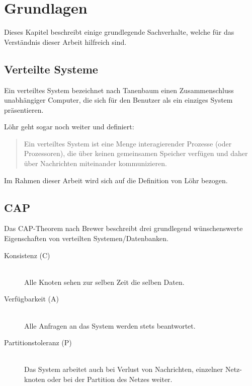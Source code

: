 \chapter{Grundlagen}
\label{chap:base}
Dieses Kapitel beschreibt einige grundlegende Sachverhalte,
welche für das Verständnis dieser Arbeit hilfreich sind.

\section{Verteilte Systeme}
\label{sec:base:vs}

Ein verteiltes System bezeichnet nach Tanenbaum \cite{tanenbaum:vs}
einen Zusammenschluss unabhängiger Computer, die sich für den Benutzer als ein einziges System präsentieren.

L\"ohr geht sogar noch weiter und definiert:
\begin{quotation}
    Ein verteiltes System ist eine Menge
    interagierender Prozesse (oder Prozessoren),
    die über keinen gemeinsamen Speicher verfügen
    und daher über Nachrichten miteinander kommunizieren. \cite{loehr:vs}
\end{quotation}

Im Rahmen dieser Arbeit wird sich auf die Definition von L\"ohr bezogen.

\section{CAP}
\label{sec:base:cap}
Das \ac{CAP}-Theorem nach Brewer \cite{brewer:cap} beschreibt drei grundlegend
wünschenswerte Eigenschaften von verteilten Systemen/Datenbanken.

\begin{description}
  \item[Konsistenz (C)] \hfill \\
      Alle Knoten sehen zur selben Zeit die selben Daten. 
  \item[Verfügbarkeit (A)] \hfill \\
      Alle Anfragen an das System werden stets beantwortet.
  \item[Partitionstoleranz (P)] \hfill \\
      Das System arbeitet auch bei Verlust von Nachrichten,
      einzelner Netz-knoten oder bei der Partition des Netzes weiter.
\end{description}

